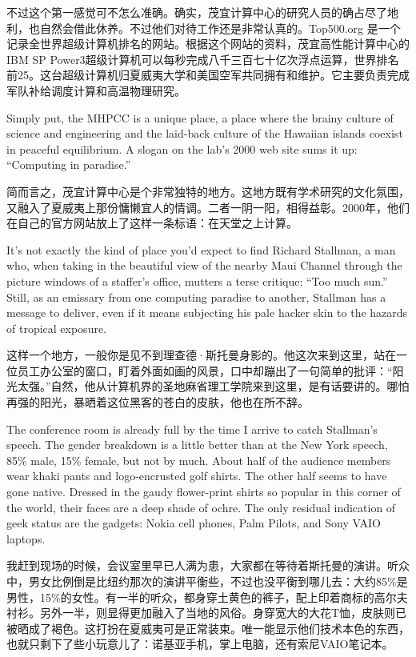 \ifdefined\chs
不过这个第一感觉可不怎么准确。确实，茂宜计算中心的研究人员的确占尽了地利，也自然会借此休养。不过他们对待工作还是非常认真的。Top500.org 是一个记录全世界超级计算机排名的网站。根据这个网站的资料，茂宜高性能计算中心的IBM SP Power3超级计算机可以每秒完成八千三百七十亿次浮点运算，世界排名前25。这台超级计算机归夏威夷大学和美国空军共同拥有和维护。它主要负责完成军队补给调度计算和高温物理研究。
\fi

\ifdefined\eng
Simply put, the MHPCC is a unique place, a place where the brainy culture of science and engineering and the laid-back culture of the Hawaiian islands coexist in peaceful equilibrium. A slogan on the lab's 2000 web site sums it up: ``Computing in paradise.''
\fi

\ifdefined\chs
简而言之，茂宜计算中心是个非常独特的地方。这地方既有学术研究的文化氛围，又融入了夏威夷上那份慵懒宜人的情调。二者一阴一阳，相得益彰。2000年，他们在自己的官方网站放上了这样一条标语：在天堂之上计算。
\fi

\ifdefined\eng
It's not exactly the kind of place you'd expect to find Richard Stallman, a man who, when taking in the beautiful view of the nearby Maui Channel through the picture windows of a staffer's office, mutters a terse critique: ``Too much sun.'' Still, as an emissary from one computing paradise to another, Stallman has a message to deliver, even if it means subjecting his pale hacker skin to the hazards of tropical exposure.
\fi

\ifdefined\chs
这样一个地方，一般你是见不到理查德·斯托曼身影的。他这次来到这里，站在一位员工办公室的窗口，盯着外面如画的风景，口中却蹦出了一句简单的批评：``阳光太强。''自然，他从计算机界的圣地麻省理工学院来到这里，是有话要讲的。哪怕再强的阳光，暴晒着这位黑客的苍白的皮肤，他也在所不辞。
\fi

\ifdefined\eng
The conference room is already full by the time I arrive to catch Stallman's speech. The gender breakdown is a little better than at the New York speech, 85\% male, 15\% female, but not by much. About half of the audience members wear khaki pants and logo-encrusted golf shirts. The other half seems to have gone native. Dressed in the gaudy flower-print shirts so popular in this corner of the world, their faces are a deep shade of ochre. The only residual indication of geek status are the gadgets: Nokia cell phones, Palm Pilots, and Sony VAIO laptops.
\fi

\ifdefined\chs
我赶到现场的时候，会议室里早已人满为患，大家都在等待着斯托曼的演讲。听众中，男女比例倒是比纽约那次的演讲平衡些，不过也没平衡到哪儿去：大约85\%是男性，15\%的女性。有一半的听众，都身穿土黄色的裤子，配上印着商标的高尔夫衬衫。另外一半，则显得更加融入了当地的风俗。身穿宽大的大花T恤，皮肤则已被晒成了褐色。这打扮在夏威夷可是正常装束。唯一能显示他们技术本色的东西，也就只剩下了些小玩意儿了：诺基亚手机，掌上电脑，还有索尼VAIO笔记本。
\fi

